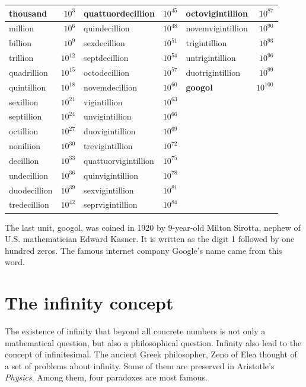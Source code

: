 \documentclass{article}
\begin{document}
\begin{center}
\begin{tabular}{|l|r|l|r|l|r|}
\hline
thousand & $10^{3}$ & quattuordecillion & $10^{45}$ & octovigintillion & $10^{87}$ \\
\hline
million & $10^{6}$ & quindecillion & $10^{48}$ & novemvigintillion & $10^{90}$ \\
\hline
billion & $10^{9}$ & sexdecillion & $10^{51}$ & trigintillion & $10^{93}$ \\
\hline
trillion  & $10^{12}$ & septdecillion & $10^{54}$ & untrigintillion & $10^{96}$ \\
\hline
quadrillion  & $10^{15}$ & octodecillion & $10^{57}$ & duotrigintillion & $10^{99}$ \\
\hline
quintillion  & $10^{18}$ & novemdecillion & $10^{60}$ & \textbf{googol} & $10^{100}$ \\
\hline
sexillion    & $10^{21}$ & vigintillion & $10^{63}$ & & \\
\hline
septillion   & $10^{24}$ & unvigintillion & $10^{66}$ & & \\
\hline
octillion    & $10^{27}$ & duovigintillion & $10^{69}$ & & \\
\hline
noniliion  & $10^{30}$ & trevigintillion & $10^{72}$ & & \\
\hline
decillion  & $10^{33}$ & quattuorvigintillion & $10^{75}$ & & \\
\hline
undecillion   & $10^{36}$ & quinvigintillion & $10^{78}$ & & \\
\hline
duodecillion  & $10^{39}$ & sexvigintillion & $10^{81}$ & & \\
\hline
tredecillion  & $10^{42}$ & seprvigintillion & $10^{84}$ & & \\
\hline
\end{tabular}
\end{center}

The last unit, googol, was coined in 1920 by 9-year-old Milton Sirotta, nephew of U.S. mathematician Edward Kasner. It is written as the digit 1 followed by one hundred zeros. The famous internet company Google's name came from this word\cite{Wikipedia-Googol}.

\section{The infinity concept}
 

The existence of infinity that beyond all concrete numbers is not only a mathematical question, but also a philosophical question. Infinity also lead to the concept of infinitesimal. The ancient Greek philosopher, Zeno of Elea thought of a set of problems about infinity. Some of them are preserved in Aristotle's {\em Physics}. Among them, four paradoxes are most famous.
\end{document}
